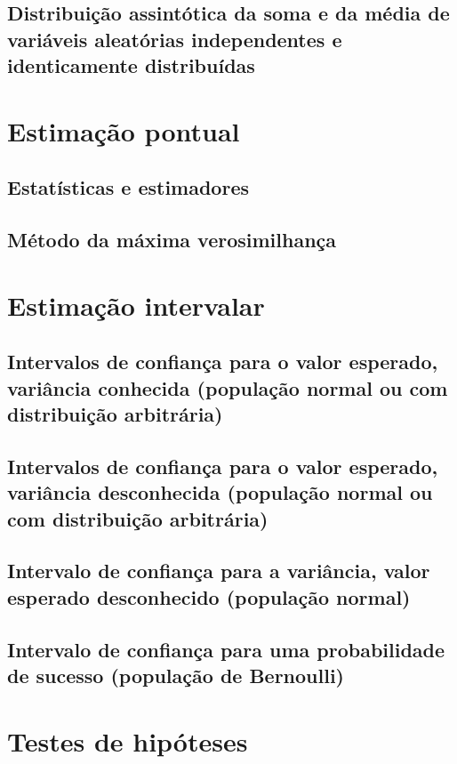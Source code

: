 \documentclass[11pt, a4paper]{article}
\begin{document}
\subsection{Distribuição assintótica da soma e da média de variáveis aleatórias independentes e identicamente distribuídas}

\newpage
\section{Estimação pontual}


\subsection{Estatísticas e estimadores}


\subsection{Método da máxima verosimilhança}

\newpage
\section{Estimação intervalar}


\subsection{Intervalos de confiança para o valor esperado, variância conhecida (população normal ou com distribuição arbitrária)}


\subsection{Intervalos de confiança para o valor esperado, variância desconhecida (população normal ou com distribuição arbitrária)}


\subsection{Intervalo de confiança para a variância, valor esperado desconhecido (população normal)}


\subsection{Intervalo de confiança para uma probabilidade de sucesso (população de Bernoulli)}

\newpage
\section{Testes de hipóteses}
\end{document}
